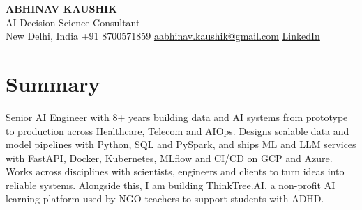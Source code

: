 \documentclass[10pt,a4paper]{article}
\begin{document}
\begin{center}
  {\LARGE\bfseries ABHINAV KAUSHIK}\\[2pt]
  {\large AI Decision Science Consultant}\\[2pt]
  New Delhi, India \textbar{} +91 8700571859 \textbar{} \href{mailto:aabhinav.kaushik@gmail.com}{aabhinav.kaushik@gmail.com} \textbar{} \href{https://www.linkedin.com/in/abhinav-kaushik10/}{LinkedIn}  
\end{center}

\section{Summary}
Senior AI Engineer with 8+ years building data and AI systems from prototype to production across Healthcare, Telecom and AIOps. Designs scalable data and model pipelines with Python, SQL and PySpark, and ships ML and LLM services with FastAPI, Docker, Kubernetes, MLflow and CI/CD on GCP and Azure. Works across disciplines with scientists, engineers and clients to turn ideas into reliable systems. Alongside this, I am building ThinkTree.AI, a non-profit AI learning platform used by NGO teachers to support students with ADHD.
\end{document}
